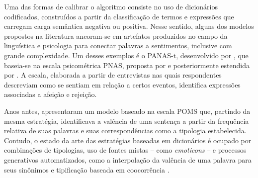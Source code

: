 \documentclass[
12pt,				%
openright,			%
twoside,			%
a4paper,			%
english,			%
french,				%
spanish,			%
brazil				%
]{abntex2}
\begin{document}
Uma das formas de calibrar o algoritmo consiste no uso de dicionários codificados, construídos a partir da classificação de termos e expressões que carregam carga semântica negativa ou positiva. Nesse sentido, alguns dos modelos propostos na literatura ancoram-se em artefatos produzidos no campo da linguística e psicologia para conectar palavras a sentimentos, inclusive com grande complexidade. Um desses exemplos é o PANAS-t, desenvolvido por  , que baseia-se na escala psicométrica PNAS, proposta por  e posteriormente estendida por . A escala, elaborada a partir de entrevistas nas quais respondentes descreviam como se sentiam em relação a certos eventos, identifica expressões associadas a afeição e rejeição. 

Anos antes,  apresentaram um modelo baseado na escala POMS \cite{mcnair2003profile} que, partindo da mesma estratégia, identificava a valência de uma sentença a partir da frequência relativa de suas palavras e suas correspondências como a tipologia estabelecida. Contudo, o estado da arte das estratégias baseadas em dicionários é ocupado por combinações de tipologias, uso de fontes mistas -- como \emph{emoticons} --  e processos generativos automatizados, como a interpolação da valência de uma palavra para seus sinônimos e tipificação baseada em coocorrência \cite{hogenboom2013exploiting, hutto2014vader, thelwall2014sentistrength, canuto2016exploiting}.
\end{document}
